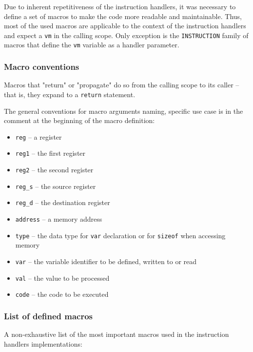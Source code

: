 \documentclass[10pt,a4paper,final]{article}
\newcommand{\code}[1]{\texttt{#1}}
\begin{document}
Due to inherent repetitiveness of the instruction handlers, it was necessary to
define a set of macros to make the code more readable and maintainable. Thus,
most of the used macros are applicable to the context of the instruction
handlers and expect a \code{vm} in the calling scope. Only exception is the
\code{INSTRUCTION} family of macros that define the \code{vm} variable as a
handler parameter.

\subsubsection{Macro conventions}
\label{sec:macrosconventions}

Macros that "return" or "propagate" do so from the calling scope to its caller
-- that is, they expand to a \code{return} statement.

The general conventions for macro arguments naming, specific use case is in the
comment at the beginning of the macro definition:

\begin{itemize}
    \item \code{reg} -- a register
    \item \code{reg1} -- the first register
    \item \code{reg2} -- the second register
    \item \code{reg_s} -- the source register
    \item \code{reg_d} -- the destination register
    \item \code{address} -- a memory address
    \item \code{type} -- the data type for \code{var} declaration or for
        \code{sizeof} when accessing memory
    \item \code{var} -- the variable identifier to be defined, written to or read
    \item \code{val} -- the value to be processed
    \item \code{code} -- the code to be executed
\end{itemize}

\subsubsection{List of defined macros}
\label{sec:macroslist}

A non-exhaustive list of the most important macros used in the instruction
handlers implementations:
\end{document}
